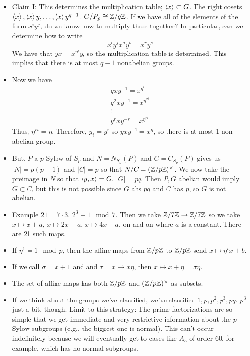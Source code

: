 \documentclass[../notes.tex]{subfiles}
\begin{document}
\begin{itemize}
\begin{itemize}
    \end{itemize}
    \item Claim I: This determines the multiplication table; $\left\langle{x}\right\rangle\subset G$. The right cosets $\left\langle{x}\right\rangle,\left\langle{x}\right\rangle y,\dots,\left\langle{x}\right\rangle y^{q-1}$. $G/P_p\cong\mathbb{Z}/q\mathbb{Z}$. If we have all of the elements of the form $x^iy^j$, do we know how to multiply these together? In particular, can we determine how to write
    \begin{equation*}
        x^iy^jx^ay^b = x^ry^s
    \end{equation*}
    We have that $yx=x^{\eta^i}y$, so the multiplication table is determined. This implies that there is at most $q-1$ nonabelian groups.
    \item Now we have
    \begin{gather*}
        yxy^{-1} = x^{\eta^i}\\
        y^2xy^{-1} = x^{\eta^{2i}}\\
        \vdots\\
        y^rxy^{-r} = x^{\eta^{ri}}
    \end{gather*}
    Thus, $\eta^{ri}=\eta$. Therefore, $y_i=y^r$ so $yxy^{-1}=x^\eta$, so there is at most 1 non abelian group.
    \item But, $P$ a $p$-Sylow of $S_p$ and $N=N_{S_p}(P)$ and $C=C_{S_p}(P)$ gives us $|N|=p(p-1)$ and $|C|=p$ so that $N/C=(\mathbb{Z}/p\mathbb{Z})^\times$. We now take the preimage in $N$ so that $\left\langle{y,x}\right\rangle=G$. $|G|=pq$. Then $P,G$ abelian would imply $G\subset C$, but this is not possible since $G$ ahs $pq$ and $C$ has $p$, so $G$ is not abelian.
    \item Example $21=7\cdot 3$. $2^3\equiv 1\mod 7$. Then we take $\mathbb{Z}/7\mathbb{Z}\to\mathbb{Z}/7\mathbb{Z}$ so we take $x\mapsto x+a$, $x\mapsto 2x+a$, $x\mapsto 4x+a$, on and on where $a$ is a constant. There are 21 such maps.
    \item If $\eta^1=1\mod p$, then the affine maps from $\mathbb{Z}/p\mathbb{Z}$ to $\mathbb{Z}/p\mathbb{Z}$ send $x\mapsto \eta^ix+b$.
    \item If we call $\sigma=x+1$ and and $\tau=x\to x\eta$, then $x\mapsto x+\eta=\sigma\eta$.
    \item The set of affine maps has both $\mathbb{Z}/p\mathbb{Z}$ and $(\mathbb{Z}/p\mathbb{Z})^\times$ as subsets.
    \item If we think about the groups we've classified, we've classified $1,p,p^2,p^3,pq$. $p^3$ just a bit, though. Limit to this strategy: The prime factorizations are so simple that we get immediate and very restrictive information about the $p$-Sylow subgroups (e.g., the biggest one is normal). This can't occur indefinitely because we will eventually get to cases like $A_5$ of order 60, for example, which has no normal subgroups.

\end{itemize}
\end{document}

